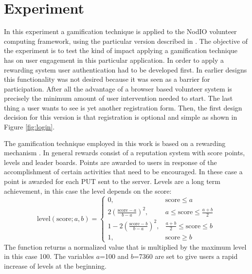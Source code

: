 \documentclass{llncs}
\begin{document}
\section{Experiment}
\label{sec:experiments}

In this experiment a gamification technique is applied to 
the {\sf NodIO} volunteer computing framework, using the 
particular version described in \cite{DBLP:conf/gecco/MereloCGCRV16,2016arXiv160101607M}.
The objective of the experiment is to test the kind of impact 
applying a gamification technique has on user engagement in this
particular application. In order to apply a rewarding system
user authentication had to be developed first. In earlier designs
this functionality was not desired because it was seen as a barrier 
for participation. After all the advantage of a browser based volunteer system
is precisely the minimum amount of user intervention needed to start.
The last thing a user wants to see is yet another registration form.
Then, the first design decision for this version is that registration is optional and simple as shown in Figure \ref{fig:login}. 

The gamification technique employed in this work is based on a rewarding mechanism  
\cite{dubois2013understanding}. In general rewards  consist of a reputation system 
with score points, levels and leader boards. Points are awarded to users in response of 
the accomplishment of certain activities that need to be encouraged. In these case
a point is awarded for each PUT sent to the server. Levels are a long
term achievement, in this case the level depends on the score:
\[ \text{level}(\text{score};a,b)= 
    \begin{cases} 
      0,                                    &  \text{score}\leq a\\    
      2(\frac{\text{score}-a}{b-a})^{2},    &  a\leq \text{score}\leq \frac{a+b}{2}\\
      1-2(\frac{\text{score}-b}{b-a})^{2},  & \frac{a+b}{2} \leq \text{score}\leq b\\
      1,                                    & \text{score}\geq b 
   \end{cases}
\]
The function returns a normalized value that is multiplied by the maximum level 
in this case 100. The variables $a$=100 and $b$=7360 are set to give users a rapid increase of 
levels at the beginning.
\end{document}
